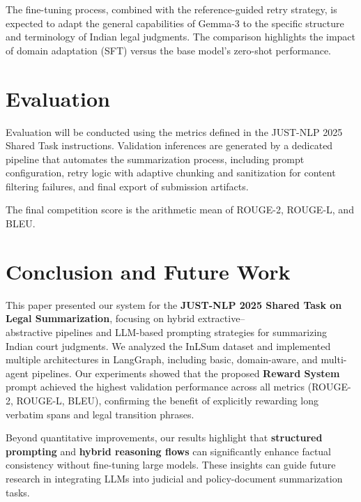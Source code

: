 \documentclass[sigconf]{acmart}
\begin{document}
\noindent The fine-tuning process, combined with the reference-guided retry strategy, is expected to adapt the general capabilities of Gemma-3 to the specific structure and terminology of Indian legal judgments. The comparison highlights the impact of domain adaptation (SFT) versus the base model's zero-shot performance.



\section{Evaluation}
Evaluation will be conducted using the metrics defined in the JUST-NLP 2025 Shared Task instructions.
Validation inferences are generated by a dedicated pipeline that automates the summarization process, including prompt configuration, retry logic with adaptive chunking and sanitization for content filtering failures, and final export of submission artifacts.

The final competition score is the arithmetic mean of ROUGE-2, ROUGE-L, and BLEU.

\section{Conclusion and Future Work}
This paper presented our system for the \textbf{JUST-NLP 2025 Shared Task on Legal Summarization}, focusing on hybrid extractive–\\abstractive pipelines and LLM-based prompting strategies for summarizing Indian court judgments.  
We analyzed the InLSum dataset and implemented multiple architectures in LangGraph, including basic, domain-aware, and multi-agent pipelines.  
Our experiments showed that the proposed \textbf{Reward System} prompt achieved the highest validation performance across all metrics (ROUGE-2, ROUGE-L, BLEU), confirming the benefit of explicitly rewarding long verbatim spans and legal transition phrases.

Beyond quantitative improvements, our results highlight that \textbf{structured prompting} and \textbf{hybrid reasoning flows} can significantly enhance factual consistency without fine-tuning large models.  
These insights can guide future research in integrating LLMs into judicial and policy-document summarization tasks.
\end{document}
